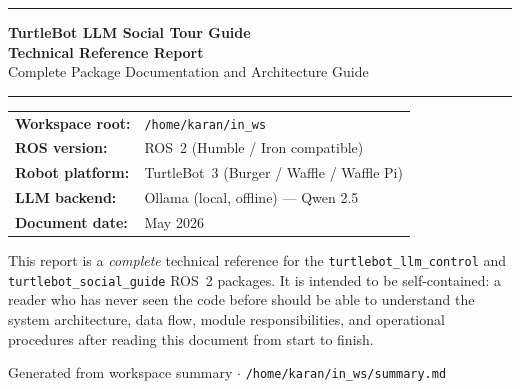 \documentclass[12pt,a4paper]{report}
\newcommand{\pkg}[1]{\texttt{\color{RoyalBlue}#1}}
\begin{document}

\begin{titlepage}
  \centering
  \vspace*{2cm}

  {\color{RoyalBlue}\rule{\linewidth}{2pt}}
  \vspace{0.6cm}

  {\Huge\bfseries TurtleBot LLM Social Tour Guide}\\[0.4cm]
  {\Large\bfseries Technical Reference Report}\\[0.2cm]
  {\large Complete Package Documentation and Architecture Guide}

  \vspace{0.4cm}
  {\color{RoyalBlue}\rule{\linewidth}{2pt}}

  \vspace{1.8cm}

  {\large
    \begin{tabular}{ll}
      \textbf{Workspace root:}  & \texttt{/home/karan/in\_ws}              \\[4pt]
      \textbf{ROS version:}     & ROS~2 (Humble / Iron compatible)          \\[4pt]
      \textbf{Robot platform:}  & TurtleBot~3 (Burger / Waffle / Waffle Pi) \\[4pt]
      \textbf{LLM backend:}     & Ollama (local, offline) — Qwen 2.5        \\[4pt]
      \textbf{Document date:}   & May 2026                                  \\
    \end{tabular}
  }

  \vspace{2cm}

  \begin{tcolorbox}[notebox, title=About this Document]
    This report is a \emph{complete} technical reference for the
    \pkg{turtlebot\_llm\_control} and \pkg{turtlebot\_social\_guide}
    ROS~2 packages.  It is intended to be self-contained: a reader
    who has never seen the code before should be able to understand
    the system architecture, data flow, module responsibilities, and
    operational procedures after reading this document from start to
    finish.
  \end{tcolorbox}

  \vfill
  {\small Generated from workspace summary $\cdot$ \texttt{/home/karan/in\_ws/summary.md}}
\end{titlepage}
\end{document}
